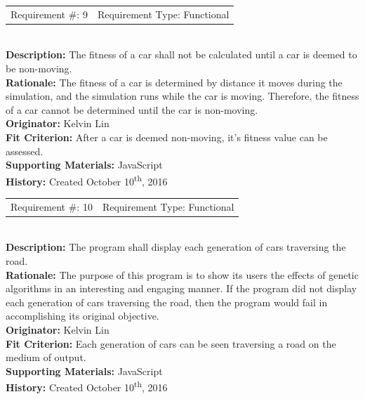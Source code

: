\documentclass[12pt, titlepage]{article}
\begin{document}
\begin{reqbox}
%
\begin{tabular}{cc}
Requirement \#: 9 & Requirement Type: Functional \\
\end{tabular} \\
%
\textbf{Description:} The fitness of a car shall not be calculated until a car 
is deemed to be non-moving. \\
\textbf{Rationale:} The fitness of a car is determined by distance it moves 
during the simulation, and the simulation runs while the car is moving. 
Therefore, the fitness of a car cannot be determined until the car is 
non-moving. \\
\textbf{Originator:} Kelvin Lin\\
\textbf{Fit Criterion:} After a car is deemed non-moving, it's fitness value can 
be assessed.\\
%  
\textbf{Supporting Materials:} JavaScript \\
\textbf{History:} Created October 10\textsuperscript{th}, 2016
%
\end{reqbox}

\begin{reqbox}
%
\begin{tabular}{cc}
Requirement \#: 10 & Requirement Type: Functional \\
\end{tabular} \\
%
\textbf{Description:} The program shall display each generation of cars 
traversing the road. \\
\textbf{Rationale:} The purpose of this program is to show its users the effects 
of genetic algorithms in an interesting and engaging manner. If the program did 
not display each generation of cars traversing the road, then the program would 
fail in accomplishing its original objective. \\
\textbf{Originator:} Kelvin Lin\\
\textbf{Fit Criterion:} Each generation of cars can be seen traversing a road on 
the medium of output.\\
%  
\textbf{Supporting Materials:} JavaScript \\
\textbf{History:} Created October 10\textsuperscript{th}, 2016
%
\end{reqbox}

\newpage
\end{document}
